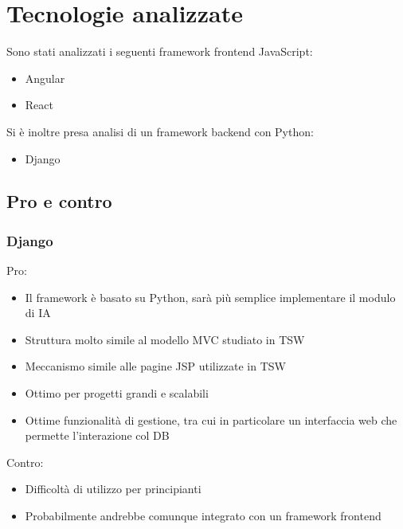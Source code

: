 \section{Tecnologie analizzate}
Sono stati analizzati i seguenti framework frontend JavaScript:
\begin{itemize}
    \item Angular
    \item React
\end{itemize}
Si è inoltre presa analisi di un framework backend con Python:
\begin{itemize}
    \item Django
\end{itemize}

\subsection{Pro e contro}
\subsubsection{Django}
Pro:
\begin{itemize}
    \renewcommand\labelitemi{\texttt{+}}
    \item Il framework è basato su Python, sarà più semplice implementare il modulo di IA
    \item Struttura molto simile al modello MVC studiato in TSW
    \item Meccanismo simile alle pagine JSP utilizzate in TSW
    \item Ottimo per progetti grandi e scalabili
    \item Ottime funzionalità di gestione, tra cui in particolare un interfaccia web 
            che permette l'interazione col DB
\end{itemize}
Contro:
\begin{itemize}
    \renewcommand\labelitemi{\texttt{-}}
    \item Difficoltà di utilizzo per principianti
    \item Probabilmente andrebbe comunque integrato con un framework frontend
\end{itemize}

